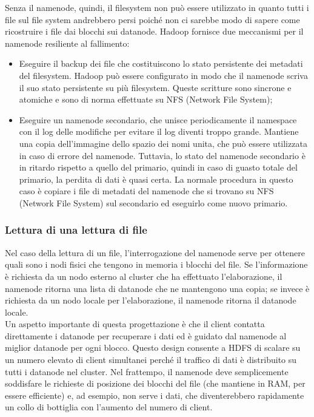 \documentclass{article}
\begin{document}
Senza il namenode, quindi, il filesystem non può essere utilizzato in quanto tutti i file sul file system andrebbero persi poiché non ci sarebbe modo di sapere come ricostruire i file dai blocchi sui datanode. Hadoop fornisce due meccanismi per  il namenode resiliente al fallimento:
\begin{itemize}
    \item Eseguire il backup dei file che costituiscono lo stato persistente dei metadati del filesystem. Hadoop può essere configurato in modo che il namenode scriva il suo stato persistente su più filesystem. Queste scritture sono sincrone e atomiche e sono di norma effettuate su NFS (Network File System);
    \item Eseguire un namenode secondario, che unisce periodicamente il namespace con il log delle modifiche per evitare il log diventi troppo grande. Mantiene una copia dell'immagine dello spazio dei nomi unita, che può essere utilizzata in caso di errore del namenode. Tuttavia, lo stato del namenode secondario è in ritardo rispetto a quello del primario, quindi in caso di guasto totale del primario, la perdita di dati è quasi certa. La normale procedura in questo caso è copiare i file di metadati del namenode che si trovano su NFS (Network File System) sul secondario ed eseguirlo come nuovo primario.
\end{itemize}

\subsubsection{Lettura di una lettura di file}
Nel caso della lettura di un file, l'interrogazione del namenode serve per ottenere quali sono i nodi fisici che tengono in memoria i blocchi del file. Se l'informazione è richiesta da un nodo esterno al cluster che ha effettuato l'elaborazione, il namenode ritorna una lista di datanode che ne mantengono una copia; se invece è richiesta da un nodo locale per l'elaborazione, il namenode ritorna il datanode locale.\\

\noindent Un aspetto importante di questa progettazione è che il client contatta direttamente i datanode per recuperare i dati ed è guidato dal namenode al miglior datanode per ogni blocco. Questo design consente a HDFS di scalare su un numero elevato di client simultanei perché il traffico di dati è distribuito su tutti i datanode nel cluster. Nel frattempo, il namenode deve semplicemente soddisfare le richieste di posizione dei blocchi del file (che mantiene in RAM, per essere efficiente) e, ad esempio, non serve i dati, che diventerebbero rapidamente un collo di bottiglia con l'aumento del numero di client.
\end{document}
